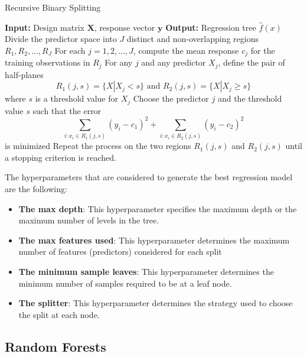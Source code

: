 \documentclass[12 pt]{scrartcl}
\numberwithin{equation}{section}
\begin{document}
\begin{algorithm}[H]
    \caption{Recursive Binary Splitting}\label{alg:cap}
    \begin{algorithmic}
    \State \textbf{Input:} Design matrix $\mathbf{X}$, response vector $\mathbf{y}$
    \State \textbf{Output:} Regression tree $\hat{f}(x)$
    \State Divide the predictor space into $J$ distinct and non-overlapping regions $R_{1}, R_{2}, ..., R_{J}$
    \State For each $j = 1,2,...,J$, compute the mean response $c_{j}$ for the training observations in $R_{j}$
    \State For any $j$ and any predictor $X_{j}$, define the pair of half-planes
    \begin{equation}
        R_{1}(j, s) = \{X|X_{j} < s\} \text{ and } R_{2}(j, s) = \{X|X_{j} \geq s\}
    \end{equation}
    \State where $s$ is a threshold value for $X_{j}$
    \State Choose the predictor $j$ and the threshold value $s$ such that the error
    \begin{equation}
        \sum_{i:x_{i} \in R_{1}(j, s)} (y_{i} - c_{1})^2 + \sum_{i:x_{i} \in R_{2}(j, s)} (y_{i} - c_{2})^2
    \end{equation}
    \State is minimized
    \State Repeat the process on the two regions $R_{1}(j, s)$ and $R_{2}(j, s)$ until a stopping criterion is reached.
    \end{algorithmic}
    \end{algorithm}

The hyperparameters that are considered to generate the best regression model are the following:
\begin{itemize}
    \item \textbf{The max depth}: This hyperparameter specifies the maximum depth or the maximum number of levels in the tree.
    \item \textbf{The max features used}: This hyperparameter determines the maximum number of features (predictors) considered for each split
    \item \textbf{The minimum sample leaves}: This hyperparameter determines the minimum number of samples required to be at a leaf node.
    \item \textbf{The splitter}: This hyperparameter determines the strategy used to choose the split at each node. 
\end{itemize}

\subsection{Random Forests}
\label{subsec:Random Forests}
\end{document}
